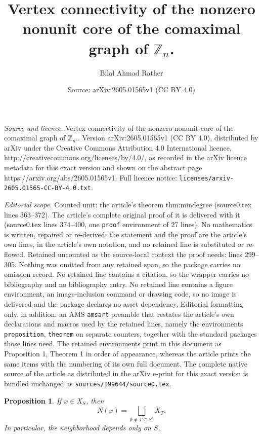 \documentclass[10pt,a4paper]{amsart}
\title{Vertex connectivity of the nonzero nonunit core of the comaximal graph of $\mathbb Z_n$.}
\author{Bilal Ahmad Rather}
\date{Source: arXiv:2605.01565v1 (CC BY 4.0)}
\newtheorem{proposition}{Proposition}
\begin{document}
\maketitle

\noindent\emph{Source and licence.} Vertex connectivity of the nonzero nonunit core of the comaximal graph of $\mathbb Z_n$.. Version arXiv:2605.01565v1 (CC BY 4.0), distributed by arXiv under the Creative Commons Attribution 4.0 International licence, http://creativecommons.org/licenses/by/4.0/, as recorded in the arXiv licence metadata for this exact version and shown on the abstract page https://arxiv.org/abs/2605.01565v1. Full licence notice: \texttt{licenses/arxiv-2605.01565-CC-BY-4.0.txt}.\par\smallskip

\noindent\textit{Editorial scope.} Counted unit: the article's theorem thm:mindegree (source0.tex lines 363--372). The article's complete original proof of it is delivered with it (source0.tex lines 374--400, one \texttt{proof} environment of 27 lines). No mathematics is written, repaired or re-derived: the statement and the proof are the article's own lines, in the article's own notation, and no retained line is substituted or re-flowed.  Retained uncounted as the source-local context the proof needs: lines 299--305.  Nothing was omitted from any retained span, so the package carries no omission record.  No retained line contains a citation, so the wrapper carries no bibliography and no bibliography entry.  No retained line contains a figure environment, an image-inclusion command or drawing code, so no image is delivered and the package declares no asset dependency.  Editorial formatting only, in addition: an AMS \texttt{amsart} preamble that restates the article's own declarations and macros used by the retained lines, namely the environments \texttt{proposition}, \texttt{theorem} on separate counters, together with the standard packages those lines need.  The retained environments print in this document as Proposition 1, Theorem 1 in order of appearance, whereas the article prints the same items with the numbering of its own full document.  The complete native source of the article as distributed in the arXiv e-print for this exact version is bundled unchanged as \texttt{sources/199644/source0.tex}.
	\begin{proposition}\label{prop:neighborhood}
		If $x\in X_S$, then
		$$
		N(x)=\bigsqcup_{\emptyset\neq T\subseteq S^c} X_T.
		$$
		In particular, the neighborhood depends only on $S$.
	\end{proposition}
\end{document}
